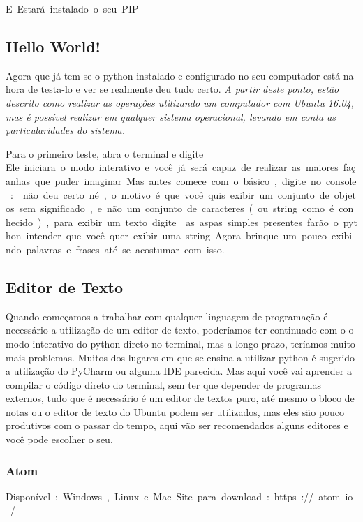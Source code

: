 
\si E Estará instalado o seu PIP
\subsection{Hello World!}
Agora que já tem-se o python instalado e configurado no seu computador está na hora de testa-lo e ver se realmente deu tudo certo.
\emph{A partir deste ponto, estão descrito como realizar as operações utilizando um computador com Ubuntu 16.04, mas é possível realizar em qualquer sistema operacional, levando em conta as particularidades do sistema.}

Para o primeiro teste, abra o terminal e digite
\si Ele iniciara o modo interativo e você já será capaz de realizar as maiores façanhas que puder imaginar. Mas antes comece com o básico, digite no console:
\si não deu certo né, o motivo é que você quis exibir um conjunto de objetos sem significado, e não um conjunto de caracteres(ou string como é conhecido), para exibir um texto digite
\si as aspas simples presentes farão o python intender que você quer exibir uma string. Agora brinque um pouco exibindo palavras e frases até se acostumar com isso.

\subsection{Editor de Texto}
Quando começamos a trabalhar com qualquer linguagem de programação é necessário a utilização de um editor de texto, poderíamos ter continuado com o o modo interativo do python direto no terminal, mas a longo prazo, teríamos muito mais problemas. Muitos dos lugares em que se ensina a utilizar python é sugerido a utilização do PyCharm ou alguma IDE parecida. Mas aqui você vai aprender a compilar o código direto do terminal, sem ter que depender de programas externos, tudo que é necessário é um editor de textos puro, até mesmo o bloco de notas ou o editor de texto do Ubuntu podem ser utilizados, mas eles são pouco produtivos com o passar do tempo, aqui vão ser recomendados alguns editores e você pode escolher o seu.
\subsubsection{Atom}

\si Disponível: Windows, Linux e Mac

\si Site para download: https://atom.io/

